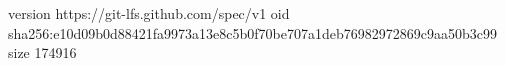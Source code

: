 version https://git-lfs.github.com/spec/v1
oid sha256:e10d09b0d88421fa9973a13e8c5b0f70be707a1deb76982972869c9aa50b3c99
size 174916
